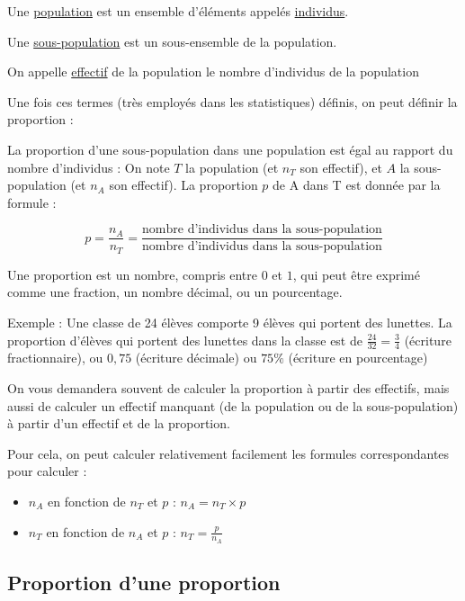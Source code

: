 \documentclass[10pt,a4paper,oneside]{book}
\begin{document}
\begin{de}
  Une \underline{population} est un ensemble d'éléments appelés \underline{individus}.
  
  Une \underline{sous-population} est un sous-ensemble de la population.

  On appelle \underline{effectif} de la population le nombre d'individus de la population 
\end{de}

Une fois ces termes (très employés dans les statistiques) définis, on peut définir la proportion :

\begin{de}
  La proportion d'une sous-population dans une population est égal au rapport du nombre d'individus : On note $T$ la population (et $n_T$ son effectif), et $A$ la sous-population (et $n_A$ son effectif). La proportion $p$ de A dans T est donnée par la formule :
  
  \[ p = \frac{n_A}{n_T} = \frac{\text{nombre d'individus dans la sous-population}}{\text{nombre d'individus dans la sous-population}}\]

\end{de}

Une proportion est un nombre, compris entre $0$ et $1$, qui peut être exprimé comme une fraction, un nombre décimal, ou un pourcentage.

Exemple : Une classe de 24 élèves comporte 9 élèves qui portent des lunettes. La proportion d'élèves qui portent des lunettes dans la classe est de $\frac{24}{32}=\frac{3}{4}$ (écriture fractionnaire), ou $0{,}75$ (écriture décimale) ou $75\%$ (écriture en pourcentage)


On vous demandera souvent de calculer la proportion à partir des effectifs, mais aussi de calculer un effectif manquant (de la population ou de la sous-population) à partir d'un effectif et de la proportion.

Pour cela, on peut calculer relativement facilement les formules correspondantes pour calculer :\begin{itemize}
  \item $n_A$ en fonction de $n_T$ et $p$ :  $n_A = n_T \times p$
  \item $n_T$ en fonction de $n_A$ et $p$ :  $n_T = \frac{p}{n_A}$
\end{itemize}

\subsection{Proportion d'une proportion}
\end{document}
